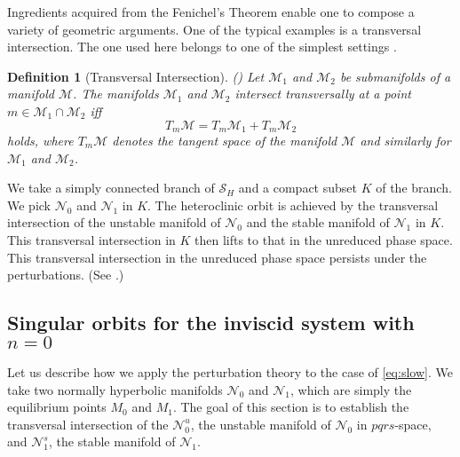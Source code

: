 \documentclass[usletter,11pt]{article}
\newtheorem{definition}{Definition}[section]
\theoremstyle{remark}
\begin{document}
Ingredients acquired from the Fenichel's Theorem enable one to compose a variety of geometric arguments. One of the typical examples is a transversal intersection. The one used here belongs to one of the simplest settings \cite[Theorem 3.1]{Sz1991}.
\begin{definition}[Transversal Intersection]  (\cite[Definition 3.1]{Sz1991})
 Let ${\mathcal{M}}_1$ and ${\mathcal{M}}_2$ be submanifolds of a manifold ${\mathcal{M}}$. The manifolds ${\mathcal{M}}_1$ and ${\mathcal{M}}_2$ intersect transversally at a point $m\in{\mathcal{M}}_1\cap {\mathcal{M}}_2$ iff 
 $$T_m{\mathcal{M}} =  T_m{\mathcal{M}}_1+T_m{\mathcal{M}}_2$$
 holds, where $T_m\mathcal{M}$ denotes the tangent space of the manifold $\mathcal{M}$ and similarly for $\mathcal{M}_1$ and $\mathcal{M}_2$.
\end{definition}

We take a simply connected branch of  $\mathcal{S}_H$ and a compact subset $K$ of the branch. We pick $\mathcal{N}_0$ and $\mathcal{N}_1$ in $K$. The heteroclinic orbit is achieved by the transversal intersection of the unstable manifold of $\mathcal{N}_0$ and the stable manifold of $\mathcal{N}_1$ in $K$. This transversal intersection in $K$ then lifts to that in the unreduced phase space. This transversal intersection in the unreduced phase space persists under the perturbations. (See \cite[Theorem 3.1]{Sz1991}.) %


\subsection{Singular orbits for the inviscid system with $n=0$}\label{sec:singorb}

Let us describe how we apply the perturbation theory to the case of \eqref{eq:slow}. We take two normally hyperbolic manifolds %
$\mathcal{N}_0$ and $\mathcal{N}_1$, which are simply the equilibrium points $M_0$ and $M_1$. The goal of this section is to establish the transversal intersection of the $\mathcal{N}_0^u$, the unstable manifold of $\mathcal{N}_0$  in $pqrs$-space, and $\mathcal{N}^s_1$, the stable manifold of $\mathcal{N}_1$.  
\end{document}
